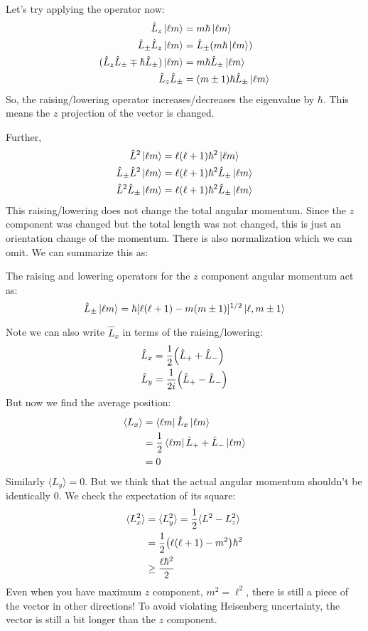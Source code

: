 Let's try applying the operator now:
\begin{align*}
    \hat{L}_z \ket{\ell m} &= m \hbar \ket{\ell m} \\
    \hat{L}_{\pm} \hat{L}_z \ket{\ell m} &= \hat{L}_{\pm}(m \hbar \ket{\ell m}) \\
    (\hat{L}_z \hat{L}_{\pm} \mp \hbar \hat{L}_{\pm}) \ket{\ell m} &= m \hbar \hat{L}_{\pm} \ket{\ell m} \\
    \hat{L}_z \hat{L}_{\pm} &= (m \pm 1) \hbar \hat{L}_{\pm} \ket{\ell m}
\end{align*}
So, the raising/lowering operator increases/decreases the eigenvalue by $\hbar$. This means the $z$ projection of the vector is changed.

Further,
\begin{align*}
    \hat{L}^2 \ket{\ell m} &= \ell (\ell + 1)\hbar^2 \ket{\ell m} \\
    \hat{L}_{\pm} \hat{L}^2 \ket{\ell m} &= \ell (\ell + 1) \hbar^2 \hat{L}_{\pm} \ket{\ell m} \\
    \hat{L}^2 \hat{L}_{\pm} \ket{\ell m} &= \ell (\ell + 1) \hbar^2 \hat{L}_{\pm} \ket{\ell m}
\end{align*}
This raising/lowering does not change the total angular momentum. Since the $z$ component was changed but the total length was not changed, this is just
an orientation change of the momentum. There is also normalization which we can omit. We can summarize this as:
\begin{theorem}
    The raising and lowering operators for the $z$ component angular momentum act as:
    \[ \hat{L}_{\pm} \ket{\ell m} = \hbar [\ell(\ell + 1) - m (m \pm 1)]^{1/2} \ket{\ell, m \pm 1}\]
\end{theorem}
Note we can also write $\hat{L}_x$ in terms of the raising/lowering:
\begin{align*}
    \hat{L}_x &= \frac{1}{2} \qty(\hat{L}_+ + \hat{L}_-) \\
    \hat{L}_y &= \frac{1}{2i} \qty(\hat{L}_+ - \hat{L}_-)
\end{align*}
But now we find the average position:
\begin{align*}
    \langle L_x \rangle &= \bra{\ell m} \hat{L}_x \ket{\ell m} \\
    &= \frac{1}{2} \bra{\ell m} \hat{L}_+ + \hat{L}_- \ket{\ell m} \\
    &= 0
\end{align*}
Similarly $\langle L_y \rangle = 0$. But we think that the actual angular momentum shouldn't be identically 0.
We check the expectation of its square:
\begin{align*}
    \langle L_x^2 \rangle &= \langle L_y^2 \rangle = \frac{1}{2} \langle L^2 - L_z^2 \rangle \\
    &= \frac{1}{2} \qty(\ell (\ell + 1) - m^2) \hbar^2 \\
    &\geq \frac{\ell \hbar^2}{2}
\end{align*}
Even when you have maximum $z$ component, $m^2 = \ell^2$, there is still a piece of the vector in other directions!
To avoid violating Heisenberg uncertainty, the vector is still a bit longer than the $z$ component.

